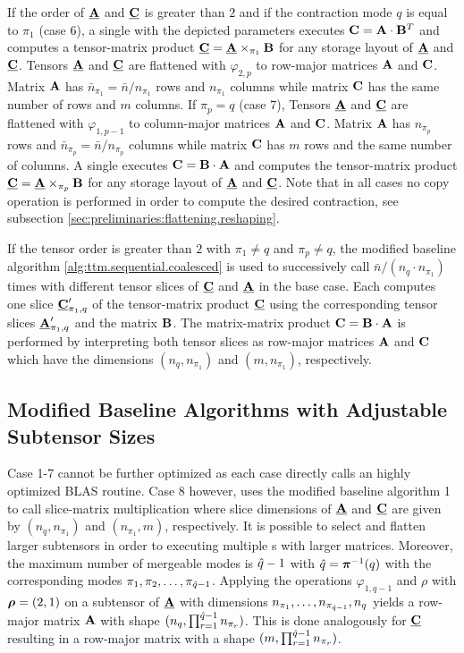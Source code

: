 If the order of $\underline{\mathbf{A}}$ and $\underline{\mathbf{C}}$ is greater than $2$ and if the contraction mode $q$ is equal to $\pi_1$ (case 6), a single  with the depicted parameters executes $\mathbf{C} = \mathbf{A} \cdot \mathbf{B}^T$ and computes a tensor-matrix product $\underline{\mathbf{C}} = \underline{\mathbf{A}} \times_{\pi_1} \mathbf{B}$ for any storage layout of $\underline{\mathbf{A}}$ and $\underline{\mathbf{C}}$.
Tensors $\underline{\mathbf{A}}$ and $\underline{\mathbf{C}}$ are flattened with $\varphi_{2,p}$ to row-major matrices $\mathbf{A}$ and $\mathbf{C}$.
Matrix $\mathbf{A}$ has $\bar{n}_{\pi_1} = \bar{n} / n_{\pi_1}$ rows and $n_{\pi_1}$ columns while matrix $\mathbf{C}$ has the same number of rows and $m$ columns.
If $\pi_p=q$ (case 7), Tensors $\underline{\mathbf{A}}$ and $\underline{\mathbf{C}}$ are flattened with $\varphi_{1,p-1}$ to column-major matrices $\mathbf{A}$ and $\mathbf{C}$.
Matrix $\mathbf{A}$ has $n_{\pi_p}$ rows and $\bar{n}_{\pi_p} =  \bar{n} / n_{\pi_p}$ columns while matrix $\mathbf{C}$ has $m$ rows and the same number of columns.
A single  executes $\mathbf{C} = \mathbf{B} \cdot \mathbf{A}$ and computes the tensor-matrix product $\underline{\mathbf{C}} = \underline{\mathbf{A}} \times_{\pi_p} \mathbf{B}$ for any storage layout of $\underline{\mathbf{A}}$ and $\underline{\mathbf{C}}$.
Note that in all cases no copy operation is performed in order to compute the desired contraction, see subsection \ref{sec:preliminaries:flattening.reshaping}.

If the tensor order is greater than $2$ with $\pi_1\neq q$ and $\pi_p \neq q$, the modified baseline algorithm \ref{alg:ttm.sequential.coalesced} is used to successively call $\bar{n} / (n_q \cdot n_{\pi_1})$ times  with different tensor slices of $\underline{\mathbf{C}}$ and $\underline{\mathbf{A}}$ in the base case.
Each  computes one slice $\underline{\mathbf{C}}_{\pi_1,q}'$ of the tensor-matrix product $\underline{\mathbf{C}}$ using the corresponding tensor slices $\underline{\mathbf{A}}_{\pi_1,q}'$ and the matrix $\mathbf{B}$.
The matrix-matrix product $\mathbf{C} = \mathbf{B} \cdot \mathbf{A}$ is performed by interpreting both tensor slices as row-major matrices $\mathbf{A}$ and $\mathbf{C}$ which have the dimensions $(n_q,n_{\pi_1})$ and $(m,n_{\pi_1})$, respectively.

\subsection{Modified Baseline Algorithms with Adjustable Subtensor Sizes}
\label{sec:design:blas.based.algorithm}
Case 1-7 cannot be further optimized as each case directly calls an highly optimized BLAS routine.
Case 8 however, uses the modified baseline algorithm 1 to call slice-matrix multiplication where slice dimensions of $\underline{\mathbf{A}}$ and $\underline{\mathbf{C}}$ are given by $(n_q,n_{\pi_1})$ and $(n_{\pi_1},m)$, respectively.
It is possible to select and flatten larger subtensors in order to executing multiple s with larger matrices.
Moreover, the maximum number of mergeable modes is $\hat{q}-1$ with $\hat{q} = \boldsymbol{\pi}^{-1}(q)$ with the corresponding modes $\pi_1,\pi_2,\dots,\pi_{\hat{q}-1}$.
Applying the operations $\varphi_{1,q-1}$ and $\rho$ with $\boldsymbol{\rho} = (2,1)$ on a subtensor of $\underline{\mathbf{A}}$ with dimensions $n_{\pi_1},\dots,n_{\pi_{\hat{q}-1}}, n_{q}$ yields a row-major matrix $\mathbf{A}$ with shape $(n_q,\prod_{r=1}^{\hat{q}-1} n_{\pi_r})$.
This is done analogously for $\underline{\mathbf{C}}$ resulting in a row-major matrix with a shape $(m, \prod_{r=1}^{\hat{q}-1} n_{\pi_r})$.

